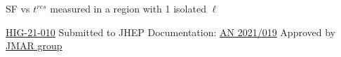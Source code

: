 {  \vspace{0.15cm}

  \footnotesize
  SF vs $t^{res}$ \pT measured in a region with 1 isolated $\ell$
  
  \vspace{-0.45cm}

  \threeColumns
      {}
      {}
      {
        \footnotesize
        \vspace{1.5cm}

        \href{http://cms-results.web.cern.ch/cms-results/public-results/publications/HIG-21-010/index.html}{\textcolor{kBlue}{HIG-21-010}}
        Submitted to JHEP\newline
        \vspace{0.1cm}Documentation: \href{https://cms.cern.ch/iCMS/user/noteinfo?cmsnoteid=CMS\%20AN-2021/019}{\textcolor{kBlue}{AN 2021/019}}\newline
        \vspace{0.1cm}Approved by \href{https://indico.cern.ch/event/1042288/contributions/4380251/attachments/2256031/3920589/updated_TopTag_JMAR_06Jul2021.pdf}{\textcolor{kBlue}{JMAR group}}

      }

}
  
